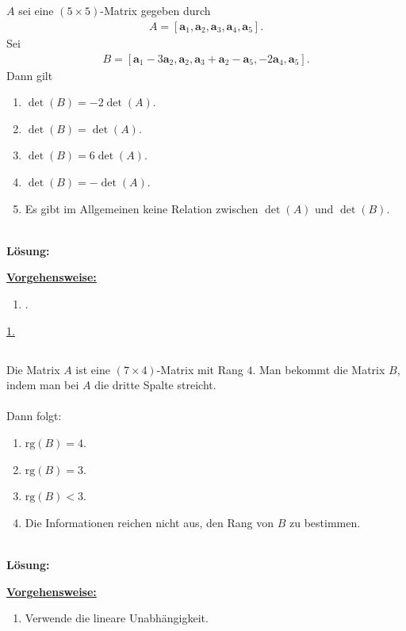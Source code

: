 \subsection*{}
$ A $ sei eine $ (5 \times 5) $-Matrix gegeben durch
\begin{align*}
	A
	=
	\left[
	\textbf{a}_1,
	\textbf{a}_2,
	\textbf{a}_3,
	\textbf{a}_4,
	\textbf{a}_5
	\right].
\end{align*}
Sei 
\begin{align*}
	B =
	\left[
	\textbf{a}_1 - 3 \textbf{a}_2,
	\textbf{a}_2,
	\textbf{a}_3 + \textbf{a}_2 - \textbf{a}_5,
	-2 \textbf{a}_4,
	\textbf{a}_5
	\right].
\end{align*}
Dann gilt
\renewcommand{\labelenumi}{(\alph{enumi})}
\begin{enumerate}
	\item 
	$ \det(B) = -2 \det(A) $.
	\item
	$ \det(B) = \det(A) $.
	\item
	$ \det(B) = 6 \det(A) $.
	\item
	$ \det(B) = -\det(A) $.
	\item
	Es gibt im Allgemeinen keine Relation zwischen $ \det(A) $ und $ \det(B) $.
\end{enumerate}
\ \\
\textbf{Lösung:}
\begin{mdframed}
\underline{\textbf{Vorgehensweise:}}
\renewcommand{\labelenumi}{\theenumi.}
\begin{enumerate}
\item .
\end{enumerate}
\end{mdframed}

\underline{1. }\\

\newpage
\subsection*{}
Die Matrix $ A $ ist eine $ (7 \times 4) $-Matrix mit Rang $ 4 $.
Man bekommt die Matrix $ B $, indem man bei $ A $ die dritte Spalte streicht.\\
\\
Dann folgt:
\renewcommand{\labelenumi}{(\alph{enumi})}
\begin{enumerate}
	\item 
	$ \mathrm{rg}(B) = 4 $.
	\item
	$ \mathrm{rg}(B) = 3 $.
	
	\item
	$ \mathrm{rg}(B) < 3 $.
	
	\item
	Die Informationen reichen nicht aus, den Rang von $ B $ zu bestimmen.
\end{enumerate}
\ \\
\textbf{Lösung:}
\begin{mdframed}
	\underline{\textbf{Vorgehensweise:}}
	\renewcommand{\labelenumi}{\theenumi.}
	\begin{enumerate}
		\item Verwende die lineare Unabhängigkeit. 
	\end{enumerate}
\end{mdframed}

